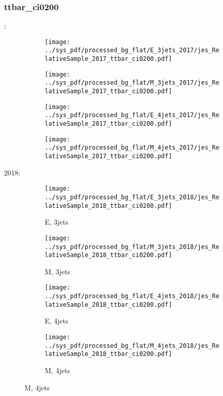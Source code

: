 \documentclass{beamer}
\begin{document}
\begin{frame}
\frametitle{ttbar_ci0200}
\fontsize{5}{1}:
\begin{figure}
\centering
\begin{subfigure}[b]{0.24\textwidth}
\texttt{[image: ../sys\_pdf/processed\_bg\_flat/E\_3jets\_2017/jes\_RelativeSample\_2017\_ttbar\_ci0200.pdf]}
\end{subfigure}
\begin{subfigure}[b]{0.24\textwidth}
\texttt{[image: ../sys\_pdf/processed\_bg\_flat/M\_3jets\_2017/jes\_RelativeSample\_2017\_ttbar\_ci0200.pdf]}
\end{subfigure}
\begin{subfigure}[b]{0.24\textwidth}
\texttt{[image: ../sys\_pdf/processed\_bg\_flat/E\_4jets\_2017/jes\_RelativeSample\_2017\_ttbar\_ci0200.pdf]}
\end{subfigure}
\begin{subfigure}[b]{0.24\textwidth}
\texttt{[image: ../sys\_pdf/processed\_bg\_flat/M\_4jets\_2017/jes\_RelativeSample\_2017\_ttbar\_ci0200.pdf]}
\end{subfigure}
\end{figure}
2018:
\begin{figure}
\centering
\begin{subfigure}[b]{0.24\textwidth}
\texttt{[image: ../sys\_pdf/processed\_bg\_flat/E\_3jets\_2018/jes\_RelativeSample\_2018\_ttbar\_ci0200.pdf]}
\captionsetup{font=tiny}
\caption{E, 3jets}
\end{subfigure}
\begin{subfigure}[b]{0.24\textwidth}
\texttt{[image: ../sys\_pdf/processed\_bg\_flat/M\_3jets\_2018/jes\_RelativeSample\_2018\_ttbar\_ci0200.pdf]}
\captionsetup{font=tiny}
\caption{M, 3jets}
\end{subfigure}
\begin{subfigure}[b]{0.24\textwidth}
\texttt{[image: ../sys\_pdf/processed\_bg\_flat/E\_4jets\_2018/jes\_RelativeSample\_2018\_ttbar\_ci0200.pdf]}
\captionsetup{font=tiny}
\caption{E, 4jets}
\end{subfigure}
\begin{subfigure}[b]{0.24\textwidth}
\texttt{[image: ../sys\_pdf/processed\_bg\_flat/M\_4jets\_2018/jes\_RelativeSample\_2018\_ttbar\_ci0200.pdf]}
\captionsetup{font=tiny}
\caption{M, 4jets}
\end{subfigure}
\end{figure}
\end{frame}
\end{document}
